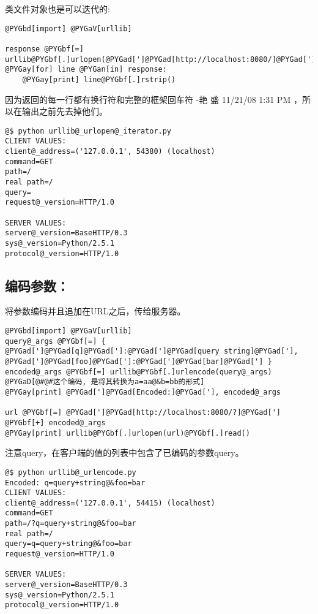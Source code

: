 \documentclass[letterpaper,10pt,english]{manual}
\begin{document}
类文件对象也是可以迭代的:

\begin{Verbatim}[commandchars=@\[\]]
@PYGbd[import] @PYGaV[urllib]

response @PYGbf[=] urllib@PYGbf[.]urlopen(@PYGad[']@PYGad[http://localhost:8080/]@PYGad['])
@PYGay[for] line @PYGan[in] response:
    @PYGay[print] line@PYGbf[.]rstrip()
\end{Verbatim}

因为返回的每一行都有换行符和完整的框架回车符 -艳 盛 11/21/08 1:31 PM ，所以在输出之前先去掉他们。

\begin{Verbatim}[commandchars=@\[\]]
@$ python urllib@_urlopen@_iterator.py
CLIENT VALUES:
client@_address=('127.0.0.1', 54380) (localhost)
command=GET
path=/
real path=/
query=
request@_version=HTTP/1.0

SERVER VALUES:
server@_version=BaseHTTP/0.3
sys@_version=Python/2.5.1
protocol@_version=HTTP/1.0
\end{Verbatim}


\subsection{编码参数：}

将参数编码并且追加在URL之后，传给服务器。

\begin{Verbatim}[commandchars=@\[\]]
@PYGbd[import] @PYGaV[urllib]
query@_args @PYGbf[=] { @PYGad[']@PYGad[q]@PYGad[']:@PYGad[']@PYGad[query string]@PYGad['], @PYGad[']@PYGad[foo]@PYGad[']:@PYGad[']@PYGad[bar]@PYGad['] }
encoded@_args @PYGbf[=] urllib@PYGbf[.]urlencode(query@_args) @PYGaD[@#@#这个编码, 是将其转换为a=aa@&b=bb的形式]
@PYGay[print] @PYGad[']@PYGad[Encoded:]@PYGad['], encoded@_args

url @PYGbf[=] @PYGad[']@PYGad[http://localhost:8080/?]@PYGad['] @PYGbf[+] encoded@_args
@PYGay[print] urllib@PYGbf[.]urlopen(url)@PYGbf[.]read()
\end{Verbatim}

注意query，在客户端的值的列表中包含了已编码的参数query。

\begin{Verbatim}[commandchars=@\[\]]
@$ python urllib@_urlencode.py
Encoded: q=query+string@&foo=bar
CLIENT VALUES:
client@_address=('127.0.0.1', 54415) (localhost)
command=GET
path=/?q=query+string@&foo=bar
real path=/
query=q=query+string@&foo=bar
request@_version=HTTP/1.0

SERVER VALUES:
server@_version=BaseHTTP/0.3
sys@_version=Python/2.5.1
protocol@_version=HTTP/1.0
\end{Verbatim}
\end{document}
